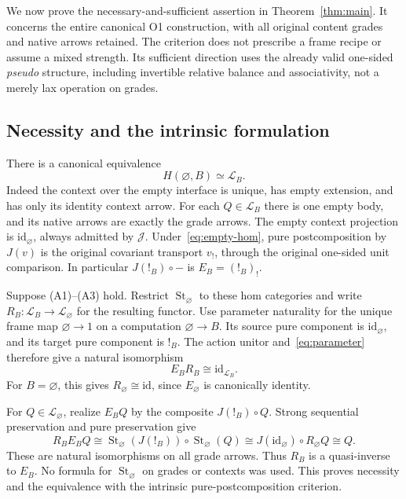 \documentclass[11pt,a4paper]{article}
\theoremstyle{definition}
\newcommand{\Lcat}{\mathcal L}
\newcommand{\J}{\mathcal J}
\newcommand{\id}{\mathrm{id}}
\newcommand{\st}{\operatorname{St}}
\begin{document}
We now prove the necessary-and-sufficient assertion in
Theorem~\ref{thm:main}. It concerns the entire canonical O1 construction,
with all original content grades and native arrows retained. The criterion
does not prescribe a frame recipe or assume a mixed strength. Its sufficient
direction uses the already valid one-sided \emph{pseudo} structure, including
invertible relative balance and associativity, not a merely lax operation
on grades.

\subsection{Necessity and the intrinsic formulation}
There is a canonical equivalence
\begin{equation}\label{eq:empty-hom}
 H(\varnothing,B)\simeq\Lcat_B.
\end{equation}
Indeed the context over the empty interface is unique, has empty extension,
and has only its identity context arrow. For each $Q\in\Lcat_B$ there is
one empty body, and its native arrows are exactly the grade arrows.
The empty context projection is $\id_\varnothing$, always admitted by
$\J$. Under~\eqref{eq:empty-hom}, pure postcomposition by $J(v)$ is the
original covariant transport $v_!$, through the original one-sided unit
comparison. In particular $J(!_B)\circ-$ is $E_B=(!_B)_!$.

Suppose (A1)--(A3) hold. Restrict $\st_\varnothing$ to these hom categories
and write $R_B:\Lcat_B\to\Lcat_\varnothing$ for the resulting functor.
Use parameter naturality for the unique frame map $\varnothing\to1$ on a
computation $\varnothing\to B$. Its source pure component is
$\id_\varnothing$, and its target pure component is $!_B$. The action
unitor and~\eqref{eq:parameter} therefore give a natural isomorphism
\begin{equation}\label{eq:empty-counit}
 E_BR_B\cong\id_{\Lcat_B}.
\end{equation}
For $B=\varnothing$, this gives $R_\varnothing\cong\id$, since
$E_\varnothing$ is canonically identity.

For $Q\in\Lcat_\varnothing$, realize $E_BQ$ by the composite
$J(!_B)\circ Q$. Strong sequential preservation and pure preservation give
\[
 R_BE_BQ\cong
 \st_\varnothing(J(!_B))\circ\st_\varnothing(Q)
 \cong J(\id_\varnothing)\circ R_\varnothing Q
 \cong Q.
\]
These are natural isomorphisms on all grade arrows. Thus $R_B$ is a
quasi-inverse to $E_B$. No formula for $\st_\varnothing$ on grades or
contexts was used. This proves necessity and the equivalence with the
intrinsic pure-postcomposition criterion.
\end{document}
